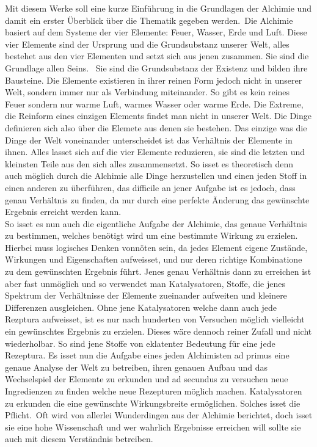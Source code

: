 \documentclass[a5paper,8pt]{book}
\begin{document}
Mit diesem Werke soll eine kurze Einführung in die Grundlagen der Alchimie und damit ein erster Überblick über die Thematik gegeben werden.\
Die Alchimie basiert auf dem Systeme der vier Elemente: Feuer, Wasser, Erde und Luft. Diese vier Elemente sind der Ursprung und die Grundsubstanz unserer Welt, alles bestehet 
aus den vier Elementen und setzt sich aus jenen zusammen. Sie sind die Grundlage allen Seins. \
Sie sind die Grundsubstanz der Existenz und bilden  ihre Bausteine. Die Elemente existieren in ihrer reinen Form jedoch nicht in unserer Welt, sondern immer nur als Verbindung 
miteinander. So gibt es kein reines Feuer sondern nur warme Luft, warmes Wasser oder warme Erde. Die Extreme, die Reinform eines einzigen Elements findet man nicht in unserer 
Welt. Die Dinge definieren sich also über die Elemete aus denen sie bestehen. Das einzige was die Dinge der Welt voneinander unterscheidet ist das Verhältnis der Elemente in 
ihnen. Alles lasset sich auf die vier Elemente reduzieren, sie sind die letzten und kleinsten Teile aus den sich alles zusammensetzt. 
So isset es theoretisch denn auch möglich durch die Alchimie alle Dinge herzustellen und einen jeden Stoff in einen anderen zu überführen, das difficile an jener Aufgabe ist 
es jedoch, dass genau Verhältnis zu finden, da nur durch eine perfekte Änderung das gewünschte Ergebnis erreicht werden kann. \\

So isset es nun auch die eigentliche Aufgabe der Alchimie, das genaue Verhältnis zu bestimmen, welches benötigt wird um eine bestimmte Wirkung zu erzielen. Hierbei muss 
logisches Denken vonnöten sein, da jedes Element eigene Zustände, Wirkungen und Eigenschaften aufweisset, und nur deren richtige Kombinatione zu dem gewünschten Ergebnis 
führt. Jenes genau Verhältnis dann zu erreichen ist aber fast unmöglich und so verwendet man Katalysatoren, Stoffe, die jenes Spektrum der Verhältnisse der Elemente zueinander 
aufweiten und kleinere Differenzen ausgleichen. Ohne jene Katalysatoren welche dann auch jede Rezptura aufweisset, ist es nur nach hunderten von Versuchen möglich vielleicht 
ein gewünschtes Ergebnis zu erzielen. Dieses wäre dennoch reiner Zufall und nicht wiederholbar. So sind jene Stoffe von eklatenter Bedeutung für eine jede Rezeptura. 
Es isset nun die Aufgabe eines jeden Alchimisten ad primus eine genaue Analyse der Welt zu betreiben, ihren genauen Aufbau und das Wechselspiel der Elemente zu erkunden  
und ad secundus zu versuchen neue Ingredienzen zu finden welche neue Rezepturen möglich machen. Katalysatoren zu erkunden die eine gewünschte Wirkungsbreite ermöglichen.
Solches isset die Pflicht.\
Oft wird von allerlei Wunderdingen aus der Alchimie berichtet, doch isset sie eine hohe Wissenschaft und wer wahrlich Ergebnisse erreichen will sollte sie auch mit diesem 
Verständnis betreiben.\\
\end{document}
